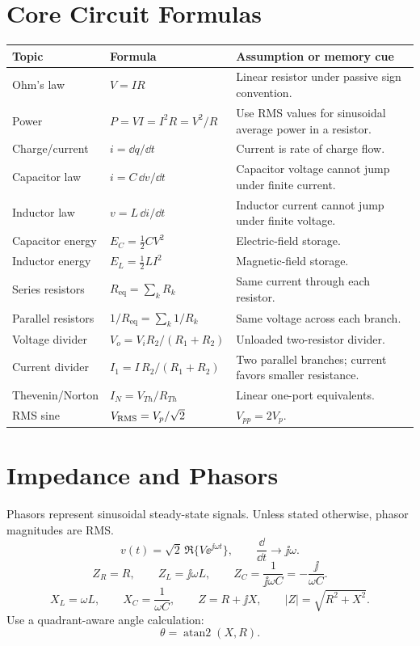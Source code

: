 \section{Core Circuit Formulas}
\begin{longtable}{@{}L{0.25\textwidth}L{0.32\textwidth}L{0.34\textwidth}@{}}
\toprule
Topic & Formula & Assumption or memory cue \\
\midrule
\endhead
Ohm's law & \(V=IR\) & Linear resistor under passive sign convention. \\
Power & \(P=VI=I^2R=V^2/R\) & Use RMS values for sinusoidal average power in a resistor. \\
Charge/current & \(i=\dd q/\dd t\) & Current is rate of charge flow. \\
Capacitor law & \(i=C\,\dd v/\dd t\) & Capacitor voltage cannot jump under finite current. \\
Inductor law & \(v=L\,\dd i/\dd t\) & Inductor current cannot jump under finite voltage. \\
Capacitor energy & \(E_C=\frac{1}{2}CV^2\) & Electric-field storage. \\
Inductor energy & \(E_L=\frac{1}{2}LI^2\) & Magnetic-field storage. \\
Series resistors & \(R_{\mathrm{eq}}=\sum_k R_k\) & Same current through each resistor. \\
Parallel resistors & \(1/R_{\mathrm{eq}}=\sum_k 1/R_k\) & Same voltage across each branch. \\
Voltage divider & \(V_o=V_i R_2/(R_1+R_2)\) & Unloaded two-resistor divider. \\
Current divider & \(I_1=I\,R_2/(R_1+R_2)\) & Two parallel branches; current favors smaller resistance. \\
Thevenin/Norton & \(I_N=V_{Th}/R_{Th}\) & Linear one-port equivalents. \\
RMS sine & \(V_{\mathrm{RMS}}=V_p/\sqrt{2}\) & \(V_{pp}=2V_p\). \\
\bottomrule
\end{longtable}

\section{Impedance and Phasors}
Phasors represent sinusoidal steady-state signals. Unless stated otherwise,
phasor magnitudes are RMS.
\[
v(t)=\sqrt{2}\,\Re\{V\ee^{\jj\omega t}\},
\qquad
\frac{\dd}{\dd t}\longrightarrow \jj\omega .
\]
\[
Z_R=R,\qquad Z_L=\jj\omega L,\qquad
Z_C=\frac{1}{\jj\omega C}=-\frac{\jj}{\omega C}.
\]
\[
X_L=\omega L,\qquad X_C=\frac{1}{\omega C},\qquad
Z=R+\jj X,\qquad |Z|=\sqrt{R^2+X^2}.
\]
Use a quadrant-aware angle calculation:
\[
\theta=\operatorname{atan2}(X,R).
\]

